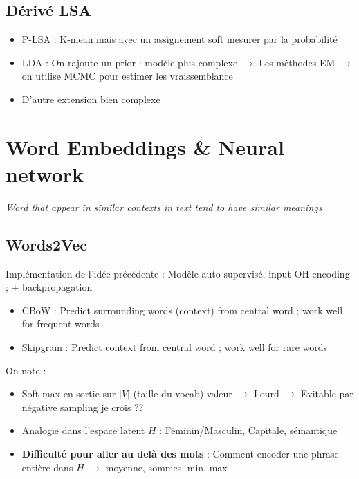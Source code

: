 \documentclass{article}
\theoremstyle{plain}%
\theoremstyle{definition}
\theoremstyle{remark}
\begin{document}
\subsection{Dérivé LSA}
\begin{itemize}
    \item P-LSA : K-mean mais avec un assignement soft mesurer par la probabilité
    \item LDA : On rajoute un prior : modèle plus complexe $\rightarrow$ Les méthodes EM  $\rightarrow$ on utilise MCMC pour estimer les vraissemblance
    \item D'autre extension bien complexe
\end{itemize}





\section{Word Embeddings \& Neural network}
{\large \begin{center}
\textit{Word that appear in similar contexts in text tend to have similar meanings}
\end{center}}

\subsection{Words2Vec}

Implémentation de l'idée précédente : Modèle auto-supervisé, input OH encoding ; + backpropagation 
\begin{itemize}
    \item CBoW : Predict surrounding words (context) from central word ; work well for frequent words
    \item Skipgram : Predict context from central word ; work well for rare words
\end{itemize}
On note : \begin{itemize}
    \item Soft max en sortie sur $ \left| V \right|  $ (taille du vocab) valeur $\rightarrow$ Lourd $\rightarrow$ Evitable par négative sampling je crois ??
    \item Analogie dans l'espace latent $ H $ : Féminin/Masculin, Capitale, sémantique 
    \item \textbf{Difficulté pour aller au delà des mots} : Comment encoder une phrase entière dans $H$ $\rightarrow$ moyenne, sommes, min, max
\end{itemize}
\end{document}
